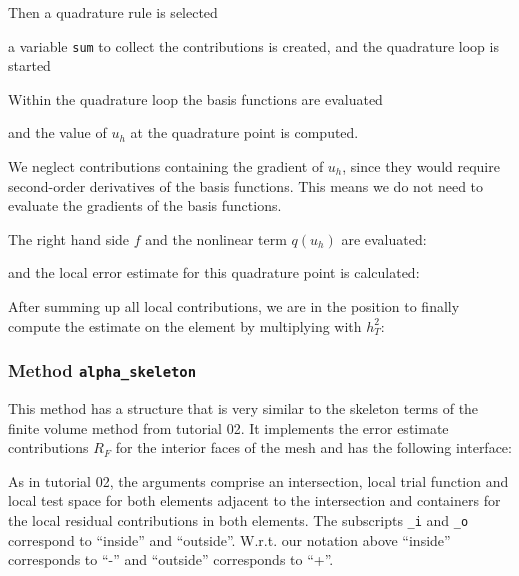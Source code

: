 \documentclass[a4paper,12pt]{article}
\begin{document}
Then a quadrature rule is selected

a variable \lstinline{sum} to collect the contributions is created, and the
quadrature loop is started


Within the quadrature loop the basis functions are evaluated

and the value of $u_h$ at the quadrature point is computed.

We neglect contributions containing the gradient of $u_h$, since they
would require second-order derivatives of the basis functions. This means we
do not need to evaluate the gradients of the basis functions.

The right hand side $f$ and the nonlinear term $q(u_h)$ are evaluated:

and the local error estimate for this quadrature point is calculated:


After summing up all local contributions, we are in the position to finally
compute the estimate on the element by multiplying with $h_T^2$:


\subsubsection*{Method \lstinline{alpha_skeleton}}

This method has a structure that is very similar to the skeleton terms of
the finite volume method from tutorial 02. It implements the error
estimate contributions $R_F$ for the interior faces of the mesh and has the
following interface:

As in tutorial 02, the arguments comprise an intersection, local trial function
and local test space for both elements adjacent to the intersection
and containers for the local residual contributions in both elements.
The subscripts \lstinline{_i} and \lstinline{_o} correspond to
``inside'' and ``outside''. W.r.t. our notation above ``inside'' corresponds to
``-'' and ``outside'' corresponds to ``+''.
\end{document}
